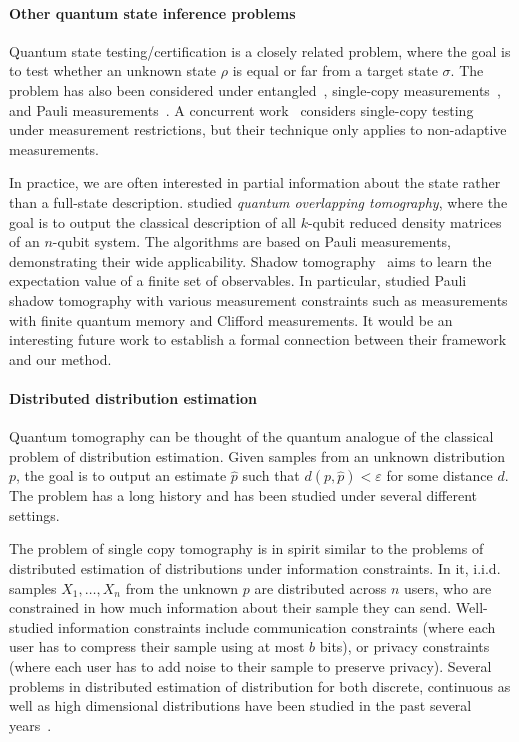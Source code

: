 \paragraph{Other quantum state inference problems} Quantum state testing/certification \cite{ODonnellW15,BadescuO019} is a closely related problem, where the goal is to test whether an unknown state $\rho$ is equal or far from a target state $\sigma$. The problem has also been considered under entangled~\cite{ODonnellW15,BadescuO019}, single-copy measurements~\cite{BubeckC020,Chen0HL22,liu2024role}, and Pauli measurements~\cite{Yu2023almost}. A concurrent work~\cite{liu2024restricted} considers single-copy testing under measurement restrictions, but their technique only applies to non-adaptive measurements.

In practice, we are often interested in partial information about the state rather than a full-state description. \cite{Cotler_2020, Garc_a_P_rez_2020, evans2019scalable} studied \textit{quantum overlapping tomography}, where the goal is to output the classical description of all $k$-qubit reduced
density matrices of an $n$-qubit system. The algorithms are based on Pauli measurements, demonstrating their wide applicability. 
Shadow tomography~\cite{Aaronson20, huang2020predicting, ChenCH021,chen2024pauli} aims to learn the expectation value of a finite set of observables. In particular, \cite{chen2024pauli} studied Pauli shadow tomography with various measurement constraints such as measurements with finite quantum memory and Clifford measurements. It would be an interesting future work to establish a formal connection between their framework and our method.


\paragraph{Distributed distribution estimation}

Quantum tomography can be thought of the quantum analogue of the classical problem of distribution estimation. Given samples from an unknown distribution $p$, the goal is to output an estimate $\hat p$ such that $d(p,\hat p)<\varepsilon$ for some distance $d$. The problem has a long history and has been studied under several different settings. 

The problem of single copy tomography is in spirit similar to the problems of distributed estimation of distributions under information constraints. 
In it, i.i.d. samples $X_1, \ldots, X_n$ from the unknown $p$ are distributed across $n$ users, who are constrained in how much information about their sample they can send. 
Well-studied information constraints include communication constraints (where each user has to compress their sample using at most $b$ bits), or privacy constraints (where each user has to add noise to their sample to preserve privacy). Several problems in distributed estimation of distribution for both discrete, continuous as well as high dimensional distributions have been studied in the past several years~\cite{duchi2013local, barnes2019lower, AcharyaCT19, acharya2020distributed}.


